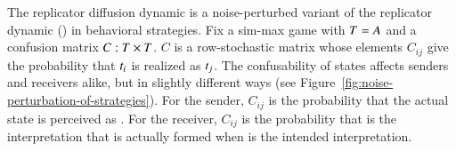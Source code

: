 \documentclass[fleqn,reqno,10pt]{article}
\newcommand{\rd}{\acro{rd}} %
\begin{document}
The replicator diffusion dynamic is a noise-perturbed variant of the
replicator dynamic (\rd) in behavioral strategies. Fix a sim-max game
with $T = A$ and a confusion matrix $C : T \times
T$. $C$ is a row-stochastic matrix whose elements $C_{ij}$ give
the probability that $t_i$ is realized as $t_j$. The
confusability of states affects senders and receivers alike, but in
slightly different ways (see
Figure~\ref{fig:noise-perturbation-of-strategies}). For the sender,
$C_{ij}$ is the probability that the actual state  is
perceived as . For the receiver, $C_{ij}$ is the
probability that  is the interpretation that is actually
formed when  is the intended interpretation.

\begin{figure}
  \centering

\end{figure}
\end{document}
